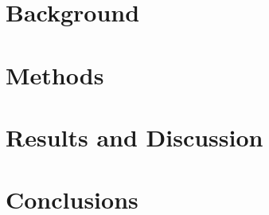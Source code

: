 \section*{Background}
 
\section*{Methods} 
 
\section*{Results and Discussion}
 
\section*{Conclusions}
 
